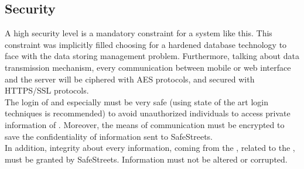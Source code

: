 \documentclass[../../../RASD.tex]{subfiles}
\begin{document}
\subsection{Security\label{sect:3.5.3}}

A high security level is a mandatory constraint for a system like this. This constraint was implicitly filled choosing for a hardened database technology to face with the data storing management problem. Furthermore, talking about data transmission mechanism, every communication between mobile or web interface and the server will be ciphered with AES protocols, and secured with HTTPS/SSL protocols. 
\\
The login of  and especially must be very safe (using state of the art login techniques is recommended) to avoid unauthorized individuals to access private information of . Moreover, the means of communication must be encrypted to save the confidentiality of information sent to SafeStreets. 
\\
In addition, integrity about every information, coming from the , related to the , must be granted by SafeStreets. Information must not be altered or corrupted. 
\end{document}
